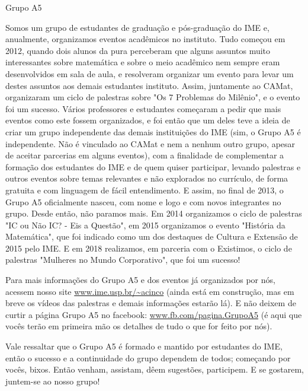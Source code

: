 \begin{subsecao}{Grupo A5}


Somos um grupo de estudantes de graduação e pós-graduação do IME e, anualmente,
organizamos eventos acadêmicos no instituto.  Tudo começou em 2012, quando dois
alunos da pura perceberam que alguns assuntos muito interessantes sobre
matemática e sobre o meio acadêmico nem sempre eram desenvolvidos em sala de
aula, e resolveram organizar um evento para levar um destes assuntos aos demais
estudantes instituto. Assim, juntamente ao CAMat, organizaram um ciclo de
palestras sobre "Os 7 Problemas do Milênio", e o evento foi um sucesso.  Vários
professores e estudantes começaram a pedir que mais eventos como este fossem
organizados, e foi então que um deles teve a ideia de criar um grupo
independente das demais instituições do IME (sim, o Grupo A5 é independente. Não
é vinculado ao CAMat e nem a nenhum outro grupo, apesar de aceitar parcerias em
alguns eventos), com a finalidade de complementar a formação dos estudantes do
IME e de quem quiser participar, levando palestras e outros eventos sobre temas
relevantes e não explorados no currículo, de forma gratuita e com linguagem de
fácil entendimento.  E assim, no final de 2013, o Grupo A5 oficialmente nasceu,
com nome e logo e com novos integrantes no grupo.  Desde então, não paramos
mais. Em 2014 organizamos o ciclo de palestras "IC ou Não IC? - Eis a Questão",
em 2015 organizamos o evento "História da Matemática", que foi indicado como um
dos destaques de Cultura e Extensão de 2015 pelo IME. E em 2018 realizamos, em 
parceria com o Existimos, o ciclo de palestras "Mulheres no Mundo Corporativo",
que foi um sucesso! 

Para mais informações do Grupo A5 e dos eventos já organizados por nós, acessem
nosso site \url{www.ime.usp.br/~acinco} (ainda está em construção, mas em breve os
vídeos das palestras e demais informações estarão lá). E não deixem de curtir
a página Grupo A5 no facebook: \url{www.fb.com/pagina.GrupoA5} (é aqui que
vocês terão em primeira mão os detalhes de tudo o que for feito por nós).

Vale ressaltar que o Grupo A5 é formado e mantido por estudantes do IME, então o
sucesso e a continuidade do grupo dependem de todos; começando por vocês,
bixos. Então venham, assistam, dêem sugestões, participem. E se gostarem,
juntem-se ao nosso grupo!

\end{subsecao}
